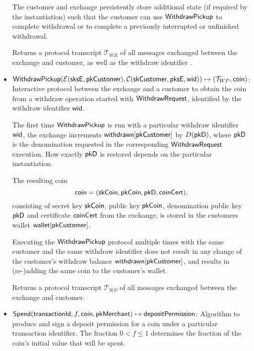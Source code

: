 \begin{itemize}
    The customer and exchange persistently store additional state (if required
    by the instantiation) such that the customer can use
    $\mathsf{WithdrawPickup}$ to complete withdrawal or to complete a previously
    interrupted or unfinished withdrawal.

    Returns a protocol transcript $\mathcal{T}_{WR}$ of all messages exchanged
    between the exchange and customer, as well as the withdraw identifier
    .

  \item $\mathsf{WithdrawPickup}(\mathcal{E}(\mathsf{sksE}, \mathsf{pkCustomer}),
    \mathcal{C}(\mathsf{skCustomer}, \mathsf{pksE}, \mathsf{wid})) \mapsto (\mathcal{T}_{WP},
    \mathsf{coin})$: Interactive protocol between the exchange and a customer to
    obtain the coin from a withdraw operation started with
    $\mathsf{WithdrawRequest}$, identified by the withdraw identifier $\mathsf{wid}$.

    The first time $\mathsf{WithdrawPickup}$ is run with a particular withdraw
    identifier $\mathsf{wid}$, the exchange increments
    $\mathsf{withdrawn}[\mathsf{pkCustomer}]$ by $D(\mathsf{pkD})$, where $\mathsf{pkD}$ is the
    denomination requested in the corresponding $\mathsf{WithdrawRequest}$
    execution.  How exactly $\mathsf{pkD}$ is restored depends on the particular instantiation.

    The resulting coin
    \[ \mathsf{coin} = (\mathsf{skCoin}, \mathsf{pkCoin}, \mathsf{pkD}, \mathsf{coinCert}), \]
    consisting of secret key $\mathsf{skCoin}$, public key
    $\mathsf{pkCoin}$, denomination public key $\mathsf{pkD}$ and certificate $\mathsf{coinCert}$ from the exchange, is stored
    in the customers wallet $\mathsf{wallet}[\mathsf{pkCustomer}]$.

    Executing the $\mathsf{WithdrawPickup}$ protocol multiple times with the same
    customer and the same withdraw identifier does not result in any change of
    the customer's withdraw balance $\mathsf{withdrawn}[\mathsf{pkCustomer}]$,
    and results in (re-)adding the same coin to the customer's wallet.

    Returns a protocol transcript $\mathcal{T}_{WP}$ of all messages exchanged
    between the exchange and customer.

  \item $\mathsf{Spend}(\mathsf{transactionId}, f, \mathsf{coin}, \mathsf{pkMerchant}) \mapsto \mathsf{depositPermission}$:
    Algorithm to produce and sign a deposit permission 
    for a coin under a particular transaction identifier.  The fraction $0 < f \le 1$ determines the
    fraction of the coin's initial value that will be spent.


\end{itemize}
